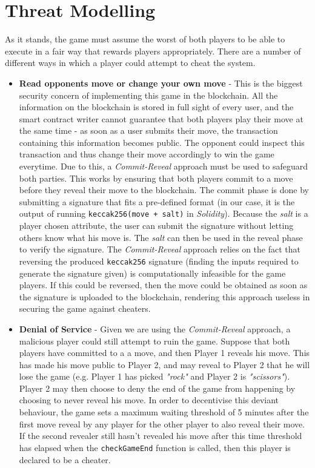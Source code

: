 \documentclass[a4paper, twoside]{article}
\begin{document}
\section{Threat Modelling}

As it stands, the game must assume the worst of both players to be able to execute in a fair way that rewards players appropriately. There are a number of different ways in which a player could attempt to cheat the system.

\begin{itemize}
	\item \textbf{Read opponents move or change your own move} - This is the biggest security concern of implementing this game in the blockchain. All the information on the blockchain is stored in full sight of every user, and the smart contract writer cannot guarantee that both players play their move at the same time - as soon as a user submits their move, the transaction containing this information becomes public. The opponent could inspect this transaction and thus change their move accordingly to win the game everytime. Due to this, a \textit{Commit-Reveal} approach must be used to safeguard both parties. This works by ensuring that both players commit to a move before they reveal their move to the blockchain. The commit phase is done by submitting a signature that fits a pre-defined format (in our case, it is the output of running \texttt{keccak256(move + salt)} in \textit{Solidity}). Because the \textit{salt} is a player chosen attribute, the user can submit the signature without letting others know what his move is. The \textit{salt} can then be used in the reveal phase to verify the signature. The \textit{Commit-Reveal} approach relies on the fact that reversing the produced \texttt{keccak256} signature (finding the inputs required to generate the signature given) is computationally infeasible for the game players. If this could be reversed, then the move could be obtained as soon as the signature is uploaded to the blockchain, rendering this approach useless in securing the game against cheaters.
	
	\item \textbf{Denial of Service} - Given we are using the \textit{Commit-Reveal} approach, a malicious player could still attempt to ruin the game. Suppose that both players have committed to a a move, and then Player 1 reveals his move. This has made his move public to Player 2, and may reveal to Player 2 that he will lose the game (e.g. Player 1 has picked \textit{"rock"} and Player 2 is \textit{"scissors"}). Player 2 may then choose to deny the end of the game from happening by choosing to never reveal his move. In order to decentivise this deviant behaviour, the game sets a maximum waiting threshold of 5 minutes after the first move reveal by any player for the other player to also reveal their move. If the second revealer still hasn't revealed his move after this time threshold has elapsed when the \texttt{checkGameEnd} function is called, then this player is declared to be a cheater.
	

\end{itemize}
\end{document}
